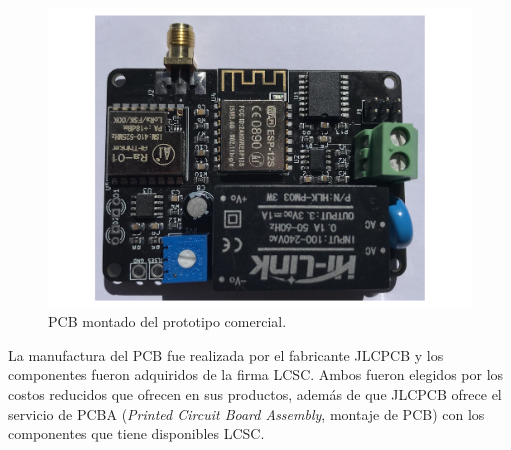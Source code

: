 \begin{figure}[h]
	\centering
	\includegraphics[scale=0.5	]{./Figures/pcb_real.pdf}
	\caption{PCB montado del prototipo comercial.}
		\label{fig:pcbReal}
\end{figure}

La manufactura del PCB fue realizada por el fabricante JLCPCB y los componentes fueron adquiridos de la firma LCSC. Ambos fueron elegidos por los costos reducidos que ofrecen en sus productos, además de que JLCPCB ofrece el servicio de PCBA (\textit{Printed Circuit Board Assembly}, montaje de PCB) con los componentes que tiene disponibles LCSC.